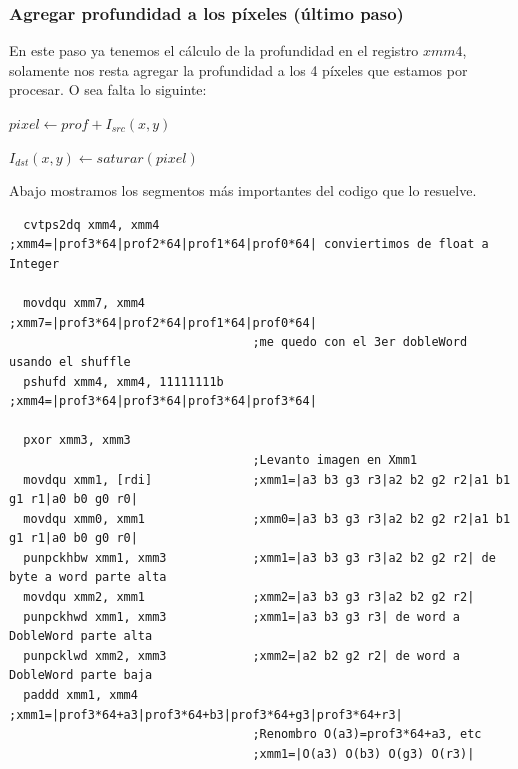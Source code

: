 \subsubsection*{Agregar profundidad a los píxeles (último paso)}

En este paso ya tenemos el cálculo de la profundidad en el registro $xmm4$, solamente nos resta agregar la profundidad a los 4 píxeles que estamos por procesar. O sea falta lo siguinte:

\begin{center}
       $pixel \gets prof + I_{src}(x, y)$    
      
      $I_{dst}(x, y) \gets saturar(pixel)$
\end{center}

Abajo mostramos los segmentos más importantes del codigo que lo resuelve.

\begin{codesnippet}
\begin{verbatim}
  cvtps2dq xmm4, xmm4             ;xmm4=|prof3*64|prof2*64|prof1*64|prof0*64| conviertimos de float a Integer

  movdqu xmm7, xmm4               ;xmm7=|prof3*64|prof2*64|prof1*64|prof0*64|
                                  ;me quedo con el 3er dobleWord usando el shuffle
  pshufd xmm4, xmm4, 11111111b    ;xmm4=|prof3*64|prof3*64|prof3*64|prof3*64|

  pxor xmm3, xmm3
                                  ;Levanto imagen en Xmm1
  movdqu xmm1, [rdi]              ;xmm1=|a3 b3 g3 r3|a2 b2 g2 r2|a1 b1 g1 r1|a0 b0 g0 r0|			
  movdqu xmm0, xmm1               ;xmm0=|a3 b3 g3 r3|a2 b2 g2 r2|a1 b1 g1 r1|a0 b0 g0 r0|
  punpckhbw xmm1, xmm3            ;xmm1=|a3 b3 g3 r3|a2 b2 g2 r2| de byte a word parte alta
  movdqu xmm2, xmm1               ;xmm2=|a3 b3 g3 r3|a2 b2 g2 r2| 
  punpckhwd xmm1, xmm3            ;xmm1=|a3 b3 g3 r3| de word a DobleWord parte alta
  punpcklwd xmm2, xmm3            ;xmm2=|a2 b2 g2 r2| de word a DobleWord parte baja
  paddd xmm1, xmm4                ;xmm1=|prof3*64+a3|prof3*64+b3|prof3*64+g3|prof3*64+r3|
                                  ;Renombro O(a3)=prof3*64+a3, etc
                                  ;xmm1=|O(a3) O(b3) O(g3) O(r3)|
\end{verbatim}
\end{codesnippet}

